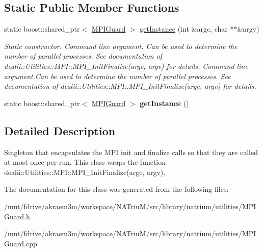\subsection*{Static Public Member Functions}
\begin{DoxyCompactItemize}
\item 
\hypertarget{classnatrium_1_1MPIGuard_a1ff461f2c920911f2ac67b4ddc57ecdc}{
static boost::shared\_\-ptr$<$ \hyperlink{classnatrium_1_1MPIGuard}{MPIGuard} $>$ \hyperlink{classnatrium_1_1MPIGuard_a1ff461f2c920911f2ac67b4ddc57ecdc}{getInstance} (int \&argc, char $\ast$$\ast$\&argv)}
\label{classnatrium_1_1MPIGuard_a1ff461f2c920911f2ac67b4ddc57ecdc}

\begin{DoxyCompactList}\small\item\em Static constructor.  Command line argument. Can be used to determine the number of parallel processes. See documentation of dealii::Utilities::MPI::MPI\_\-InitFinalize(argc, argv) for details.  Command line argument.Can be used to determine the number of parallel processes. See documentation of dealii::Utilities::MPI::MPI\_\-InitFinalize(argc, argv) for details. \item\end{DoxyCompactList}\item 
\hypertarget{classnatrium_1_1MPIGuard_a5896abef9f379f89b746e71c4d3e68aa}{
static boost::shared\_\-ptr$<$ \hyperlink{classnatrium_1_1MPIGuard}{MPIGuard} $>$ {\bfseries getInstance} ()}
\label{classnatrium_1_1MPIGuard_a5896abef9f379f89b746e71c4d3e68aa}

\end{DoxyCompactItemize}


\subsection{Detailed Description}
Singleton that encapsulates the MPI init and finalize calls so that they are called at most once per run. This class wraps the function dealii::Utilities::MPI::MPI\_\-InitFinalize(argc, argv). 

The documentation for this class was generated from the following files:\begin{DoxyCompactItemize}
\item 
/mnt/fdrive/akraem3m/workspace/NATriuM/src/library/natrium/utilities/MPIGuard.h\item 
/mnt/fdrive/akraem3m/workspace/NATriuM/src/library/natrium/utilities/MPIGuard.cpp\end{DoxyCompactItemize}
